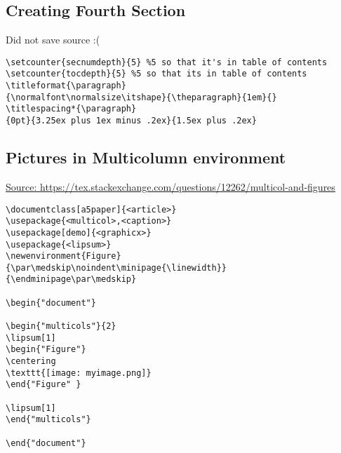\documentclass[11pt, letterpaper]{article}
\begin{document}
\subsection*{Creating Fourth Section} 
Did not save source :(
\begin{lstlisting}
\setcounter{secnumdepth}{5} %5 so that it's in table of contents
\setcounter{tocdepth}{5} %5 so that its in table of contents 
\titleformat{\paragraph}
{\normalfont\normalsize\itshape}{\theparagraph}{1em}{}
\titlespacing*{\paragraph}
{0pt}{3.25ex plus 1ex minus .2ex}{1.5ex plus .2ex}
\end{lstlisting}

\newpage 
\subsection*{Pictures in Multicolumn environment} 
\href{
	https://tex.stackexchange.com/questions/12262/multicol-and-figures
}{Source: 
	https://tex.stackexchange.com/questions/12262/multicol-and-figures
}
\begin{lstlisting} 
\documentclass[a5paper]{<article>}
\usepackage{<multicol>,<caption>}
\usepackage[demo]{<graphicx>}
\usepackage{<lipsum>}
\newenvironment{Figure}
{\par\medskip\noindent\minipage{\linewidth}}
{\endminipage\par\medskip}

\begin{"document"}

\begin{"multicols"}{2}
\lipsum[1]
\begin{"Figure"}
\centering
\texttt{[image: myimage.png]}
\end{"Figure" }

\lipsum[1]
\end{"multicols"}

\end{"document"}
\end{lstlisting}


 
\end{document}
